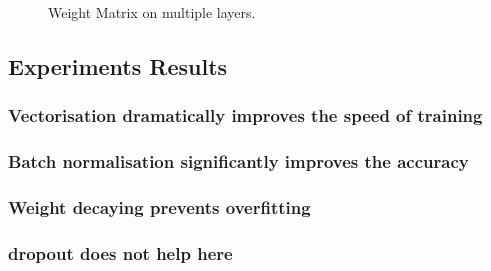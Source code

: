 \begin{figure}
    \caption{\label{fig:my-label3}Weight Matrix on multiple layers.}
\end{figure}


\subsection{Experiments Results}
\subsubsection{Vectorisation dramatically improves the speed of training}
\subsubsection{Batch normalisation significantly improves the accuracy}
\subsubsection{Weight decaying prevents overfitting}
\subsubsection{dropout does not help here}
